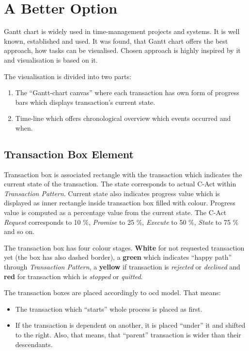 \section{A Better Option}
Gantt chart is widely used in time-management projects and systems. It is well known, established and used. It was found, that Gantt chart offers the best approach, how tasks can be visualised. Chosen approach is highly inspired by it and visualisation is based on it. 

The visualisation is divided into two parts:
\begin{enumerate}
\item The ``Gantt-chart canvas'' where each transaction has own form of progress bars which displays transaction's current state.
\item Time-line which offers chronological overview which events occurred and when. 
\end{enumerate}
\subsection{Transaction Box Element}
Transaction box is associated rectangle with the transaction which indicates the current state of the transaction. The state corresponds to actual C-Act within \textit{Transaction Pattern}. Current state also indicates progress value which is displayed as inner rectangle inside transaction box filled with colour. Progress value is computed as a percentage value from the current state. The C-Act \textit{Request} corresponds to 10 \%, \textit{Promise} to 25 \%, \textit{Execute} to 50 \%, \textit{State} to 75 \% and so on.  

The transaction box has four colour stages. \textbf{White} for not requested transaction yet (the box has also dashed border), a \textbf{green} which indicates ``happy path'' through \textit{Transaction Pattern}, a \textbf{yellow} if transaction is \textit{rejected} or \textit{declined} and \textbf{red} for transaction which is \textit{stopped} or \textit{quitted}. 

The transaction boxes are placed accordingly to \gls{ocd} model. That means:
\begin{itemize}
\item The transaction which ``starts'' whole process is placed as first. 
\item If the transaction is dependent on another, it is placed ``under'' it and shifted to the right. Also, that means, that ``parent'' transaction is wider than their descendants. 
\end{itemize}
